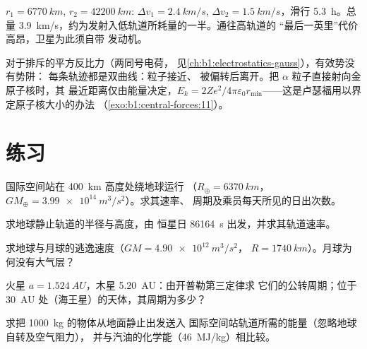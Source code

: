 \begin{example}[从低轨道到地球静止轨道]\label{ex:b1:central-forces:leogeo}
$r_1 = \qty{6770}{km}$, $r_2 = \qty{42200}{km}$: $\Delta v_1 = \qty{2.4}{km/s}$,
$\Delta v_2 = \qty{1.5}{km/s}$，滑行 \qty{5.3}{h}。总量
\qty{3.9}{km/s}，约为发射入低轨道所耗量的一半。通往高轨道的
“最后一英里”代价高昂，卫星为此须自带
发动机。
\end{example}

\begin{remark}[排斥中心]\label{rem:b1:central-forces:rutherford}
对于排斥的平方反比力（两同号电荷，
见\cref{ch:b1:electrostatics-gauss}），有效势没有势阱：
每条轨迹都是双曲线：粒子接近、
被偏转后离开。把 $\alpha$ 粒子直接射向金原子核时，其
最近距离仅由能量决定，$E_k =
2Ze^2/4\pi\varepsilon_0 r_{\min}$——这是卢瑟福用以界定原子核大小的办法
（\cref{exo:b1:central-forces:11}）。
\end{remark}

\section{练习}

\begin{exercise}[$\star$]\label{exo:b1:central-forces:1}
国际空间站在 \qty{400}{km} 高度处绕地球运行
（$R_\oplus = \qty{6370}{km}$，$GM_\oplus = \qty{3.99e14}{m^3/s^2}$）。求其速率、
周期及乘员每天所见的日出次数。
\end{exercise}

\begin{exercise}[$\star$]\label{exo:b1:central-forces:2}
求地球静止轨道的半径与高度，由
恒星日 \qty{86164}{s} 出发，并求其轨道速率。
\end{exercise}

\begin{exercise}[$\star$]\label{exo:b1:central-forces:3}
求地球与月球的逃逸速度（$GM = \qty{4.90e12}{m^3/s^2}$，
$R = \qty{1740}{km}$）。月球为何没有大气层？
\end{exercise}

\begin{exercise}[$\star$]\label{exo:b1:central-forces:4}
火星 $a = \qty{1.524}{AU}$，木星 \qty{5.20}{AU}：由开普勒第三定律求
它们的公转周期；位于 \qty{30}{AU} 处（海王星）的天体，其周期为多少？
\end{exercise}

\begin{exercise}[$\star\star$]\label{exo:b1:central-forces:5}
求把 \qty{1000}{kg} 的物体从地面静止出发送入
国际空间站轨道所需的能量（忽略地球自转及空气阻力），
并与汽油的化学能（\qty{46}{MJ/kg}）相比较。
\end{exercise}

